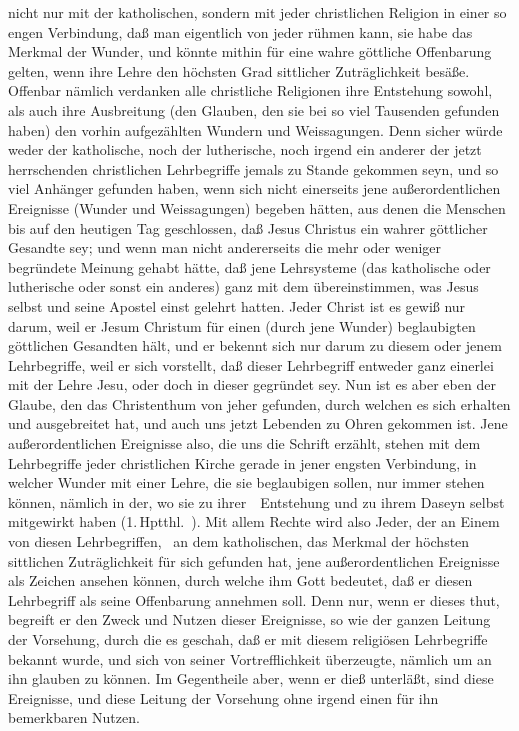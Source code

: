 \begin{aufza}
\item nicht nur mit der katholischen, sondern mit jeder christlichen Religion in einer so engen Verbindung, daß man eigentlich von jeder rühmen kann, sie habe das Merkmal der Wunder, und könnte mithin für eine wahre göttliche Offenbarung gelten, wenn ihre Lehre den höchsten Grad sittlicher Zuträglichkeit besäße. Offenbar nämlich verdanken alle christliche Religionen ihre Entstehung sowohl, als auch ihre Ausbreitung (den Glauben, den sie bei so viel Tausenden gefunden haben) den vorhin aufgezählten Wundern und Weissagungen. Denn sicher würde weder der katholische, noch der lutherische, noch irgend ein anderer der jetzt herrschenden christlichen Lehrbegriffe jemals zu Stande gekommen seyn, und so viel Anhänger gefunden haben, wenn sich nicht einerseits jene außerordentlichen Ereignisse (Wunder und Weissagungen) begeben hätten, aus denen die Menschen bis auf den heutigen Tag geschlossen, daß Jesus Christus ein wahrer göttlicher Gesandte sey; und wenn man nicht andererseits die mehr oder weniger begründete Meinung gehabt hätte, daß jene Lehrsysteme (das katholische oder lutherische oder sonst ein anderes) ganz mit dem übereinstimmen, was Jesus selbst und seine Apostel einst gelehrt hatten. Jeder Christ ist es gewiß nur darum, weil er Jesum Christum für einen (durch jene Wunder) beglaubigten göttlichen Gesandten hält, und er bekennt sich nur darum zu diesem oder jenem Lehrbegriffe, weil er sich vorstellt, daß dieser Lehrbegriff entweder ganz einerlei mit der Lehre Jesu, oder doch in dieser gegründet sey. Nun ist es aber eben der Glaube, den das Christenthum von jeher gefunden, durch welchen es sich erhalten und ausgebreitet hat, und auch uns jetzt Lebenden zu Ohren gekommen ist. Jene außerordentlichen Ereignisse also, die uns die Schrift erzählt, stehen mit dem Lehrbegriffe jeder christlichen Kirche gerade in jener engsten Verbindung, in welcher Wunder mit einer Lehre, die sie beglaubigen sollen, nur immer stehen können, nämlich in der, wo sie zu ihrer~\ Entstehung und zu ihrem Daseyn selbst mitgewirkt haben (1.\,Hptthl.\ ). Mit allem Rechte wird also Jeder, der an Einem von diesen Lehrbegriffen, \zB\ an dem katholischen, das Merkmal der höchsten sittlichen Zuträglichkeit für sich gefunden hat, jene außerordentlichen Ereignisse als Zeichen ansehen können, durch welche ihm Gott bedeutet, daß er diesen Lehrbegriff als seine Offenbarung annehmen soll. Denn nur, wenn er dieses thut, begreift er den Zweck und Nutzen dieser Ereignisse, so wie der ganzen Leitung der Vorsehung, durch die es geschah, daß er mit diesem religiösen Lehrbegriffe bekannt wurde, und sich von seiner Vortrefflichkeit überzeugte, nämlich um an ihn glauben zu können. Im Gegentheile aber, wenn er dieß unterläßt, sind diese Ereignisse, und diese Leitung der Vorsehung ohne irgend einen für ihn bemerkbaren Nutzen.

\end{aufza}
